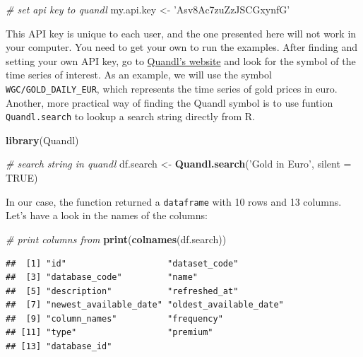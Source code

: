 \documentclass[11pt,]{book}
\newenvironment{Shaded}{\begin{snugshade}}{\end{snugshade}}
\newcommand{\KeywordTok}[1]{\textcolor[rgb]{0.27,0.27,0.27}{\textbf{#1}}}
\newcommand{\DataTypeTok}[1]{\textcolor[rgb]{0.27,0.27,0.27}{#1}}
\newcommand{\StringTok}[1]{\textcolor[rgb]{0.5,0.5,0.5}{#1}}
\newcommand{\CommentTok}[1]{\textcolor[rgb]{0.56,0.35,0.01}{\textit{#1}}}
\newcommand{\OtherTok}[1]{\textcolor[rgb]{0.56,0.35,0.01}{#1}}
\newcommand{\NormalTok}[1]{#1}
\begin{document}
\begin{Shaded}
\begin{Highlighting}[]
\CommentTok{# set api key to quandl}
\NormalTok{my.api.key <-}\StringTok{ 'Asv8Ac7zuZzJSCGxynfG'}
\end{Highlighting}
\end{Shaded}

This API key is unique to each user, and the one presented here will not
work in your computer. You need to get your own to run the examples.
After finding and setting your own API key, go to
\href{https://www.quandl.com/search?query=}{Quandl's website} and look
for the symbol of the time series of interest. As an example, we will
use the symbol \texttt{WGC/GOLD\_DAILY\_EUR}, which represents the time
series of gold prices in euro. Another, more practical way of finding
the Quandl symbol is to use funtion \texttt{Quandl.search} to lookup a
search string directly from R.

\begin{Shaded}
\begin{Highlighting}[]
\KeywordTok{library}\NormalTok{(Quandl)}

\CommentTok{# search string in quandl}
\NormalTok{df.search <-}\StringTok{ }\KeywordTok{Quandl.search}\NormalTok{(}\StringTok{'Gold in Euro'}\NormalTok{, }\DataTypeTok{silent =} \OtherTok{TRUE}\NormalTok{)}
\end{Highlighting}
\end{Shaded}

In our case, the function returned a \texttt{dataframe} with 10 rows and
13 columns. Let's have a look in the names of the columns:

\begin{Shaded}
\begin{Highlighting}[]
\CommentTok{# print columns from }
\KeywordTok{print}\NormalTok{(}\KeywordTok{colnames}\NormalTok{(df.search))}
\end{Highlighting}
\end{Shaded}

\begin{verbatim}
##  [1] "id"                    "dataset_code"         
##  [3] "database_code"         "name"                 
##  [5] "description"           "refreshed_at"         
##  [7] "newest_available_date" "oldest_available_date"
##  [9] "column_names"          "frequency"            
## [11] "type"                  "premium"              
## [13] "database_id"
\end{verbatim}
\end{document}
